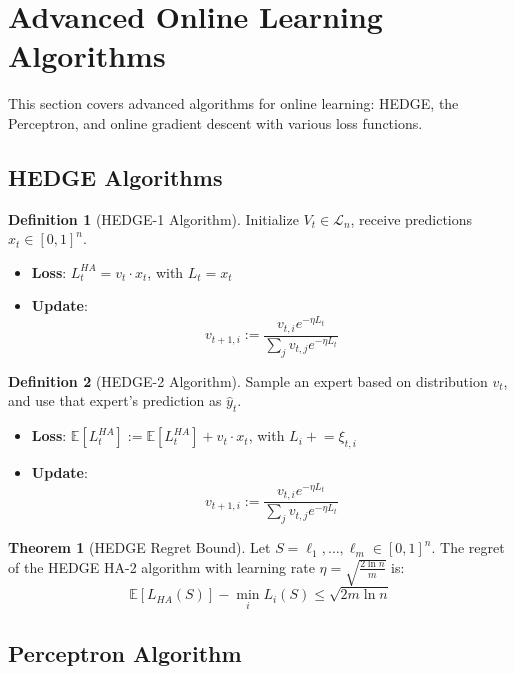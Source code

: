 \documentclass[12pt,a4paper]{article}
\theoremstyle{definition}
\newtheorem{definition}{Definition}[section]
\newtheorem{theorem}{Theorem}[section]
\begin{document}
\newpage


\section{Advanced Online Learning Algorithms}

This section covers advanced algorithms for online learning: HEDGE, the Perceptron, and online gradient descent with various loss functions.

\subsection{HEDGE Algorithms}

\begin{definition}[HEDGE-1 Algorithm]
Initialize $V_t \in \mathcal{L}_n$, receive predictions $x_t \in [0,1]^n$. 
\begin{itemize}
    \item \textbf{Loss}: $L_t^{HA} = v_t \cdot x_t$, with $L_t = x_t$
    \item \textbf{Update}: 
    \[
    v_{t+1,i} := \frac{v_{t,i} e^{-\eta L_t}}{\sum_j v_{t,j} e^{-\eta L_t}}
    \]
\end{itemize}
\end{definition}

\begin{definition}[HEDGE-2 Algorithm]
Sample an expert based on distribution $v_t$, and use that expert's prediction as $\hat{y}_t$.
\begin{itemize}
    \item \textbf{Loss}: $\mathbb{E}[L_t^{HA}] := \mathbb{E}[L_t^{HA}] + v_t \cdot x_t$, with $L_i \mathrel{+}= \xi_{t,i}$
    \item \textbf{Update}:
    \[
    v_{t+1,i} := \frac{v_{t,i} e^{-\eta L_t}}{\sum_j v_{t,j} e^{-\eta L_t}}
    \]
\end{itemize}
\end{definition}

\begin{theorem}[HEDGE Regret Bound]
Let $S = \ell_1, \ldots, \ell_m \in [0,1]^n$. The regret of the HEDGE HA-2 algorithm with learning rate $\eta = \sqrt{\frac{2 \ln n}{m}}$ is:
\[
\mathbb{E}[L_{HA}(S)] - \min_i L_i(S) \leq \sqrt{2m \ln n}
\]
\end{theorem}

\subsection{Perceptron Algorithm}
\end{document}
